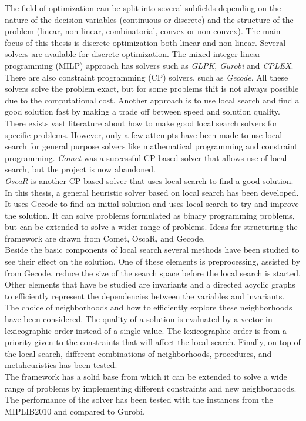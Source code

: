 The field of optimization can be split into several subfields depending on the nature of the decision variables 
(continuous or discrete) and the structure of the problem (linear, non linear, combinatorial, convex or non 
convex). The main focus of this thesis is discrete optimization both linear and non linear. 
Several solvers are available for discrete optimization. The mixed integer linear programming (MILP) approach has 
solvers such as \emph{GLPK}, \emph{Gurobi} and \emph{CPLEX}. There are also constraint programming (CP) solvers, such 
as \emph{Gecode}. All these solvers solve the problem exact, but for some problems thit is not always possible due to 
the computational cost. Another approach is to use local search and find a good solution fast by making a trade off 
between speed and solution quality. \medskip \\ 
There exists vast literature about how to make good local search solvers for specific problems.
However, only a few attempts have been made to use local search for general purpose solvers like 
mathematical programming and constraint programming. \emph{Comet} was a successful CP based solver that allows 
use of local search, but the project is now abandoned.  \\ 
\emph{OscaR} is another CP based solver that uses local search to find a good solution. 
In this thesis, a general heuristic solver based on local search has been developed. It uses Gecode to find 
an initial solution and uses local search to try and improve the solution. It can solve problems formulated as 
binary programming problems, but can be extended to solve a wider range of problems. Ideas for structuring the framework 
are drawn from Comet, OscaR, and Gecode. \medskip \\
Beside the basic components of local search several methods have been studied to see their effect on the solution.
 One of these elements is preprocessing, assisted by from Gecode, reduce the size of the search space before 
the local search is started. Other elements that have be studied are invariants and a directed acyclic graphs to 
efficiently represent the dependencies between the variables and invariants. The choice of neighborhoods and how to 
efficiently explore these neighborhoods have been considered. The quality of a solution is evaluated by a vector in 
lexicographic order instead of a single value. The lexicographic order is from a priority given to the constraints that 
will affect the local search. Finally, on top of the local search, different combinations of neighborhoods, procedures, 
and metaheuristics has been tested. \medskip \\   
The framework has a solid base from which it can be extended to solve a wide range of problems by implementing 
different constraints and new neighborhoods. \medskip \\
The performance of the solver has been tested with the instances from the MIPLIB2010 and compared to Gurobi.  


